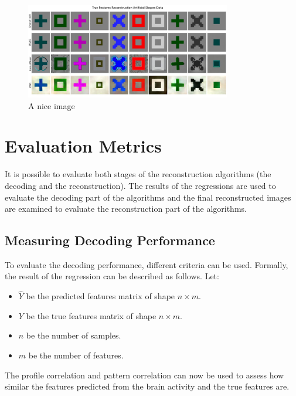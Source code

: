 \begin{figure}[ht]
    \centering
    \includegraphics[width=0.8\textwidth]{plots/baseline_true_recon_art.JPEG}
    \caption{A nice image}\label{fig:baselinetruerecon_art}
\end{figure}


\section{Evaluation Metrics}

It is possible to evaluate both stages of the reconstruction algorithms (the decoding and the reconstruction). The results of the regressions are used to evaluate the decoding part of the algorithms and the final reconstructed images are examined to evaluate the reconstruction part of the algorithms.

\subsection{Measuring Decoding Performance}
To evaluate the decoding performance, different criteria can be used. Formally, the result of the regression can be described as follows. Let:
\begin{itemize}
    \item \( \hat{Y} \) be the predicted features matrix of shape \( n \times m \).
    \item \( Y \) be the true features matrix of shape \( n \times m \).
    \item \( n \) be the number of samples.
    \item \( m \) be the number of features.
\end{itemize}

The profile correlation and pattern correlation can now be used to assess how similar the features predicted from the brain activity and the true features are\cite{horikawaGenericDecodingSeen2017}. 

